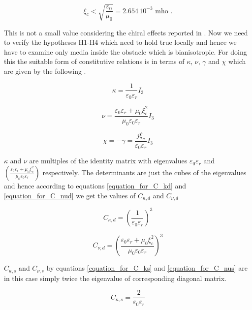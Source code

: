 \begin{equation} \label{eq:inf_sup_wu_jaggard}
\xi_c < \sqrt{\frac{\varepsilon_0}{\mu_0}} = 2.654 \, 10^{-3}  \text{ mho }.
\end{equation}

This is not a small value considering the chiral effects reported in \cite{wujaggard}. 
Now we need to verify the hypotheses H1-H4 which need to hold true locally and hence
we have to examine only media inside the obstacle which is bianisotropic. 
For doing this the suitable form 
of constitutive relations is in terms of $\kappa$, $\nu$, $\gamma$ and $\chi$ 
which are given by the following \cite{noiregolarita}. 

\begin{equation}
\kappa = \frac{1}{\varepsilon_0\varepsilon_r}I_3
\end{equation}

\begin{equation}
\nu = \frac{\varepsilon_0\varepsilon_r+\mu_0\xi_c^2}{\mu_0\varepsilon_0\varepsilon_r}I_3
\end{equation}

\begin{equation}
\chi = -\gamma = \frac{j\xi_c}{\varepsilon_0\varepsilon_r}I_3
\end{equation}

$\kappa$ and $\nu$ are multiples of the identity matrix with eigenvalues $\varepsilon_0\varepsilon_r$ 
and $(\frac{\varepsilon_0\varepsilon_r+\mu_0\xi_c^2}{\mu_0\varepsilon_0\varepsilon_r})$ respectively.
The determinants are just the cubes of the eigenvalues and hence according to equations 
\eqref{equation_for_C_kd} and \eqref{equation_for_C_nud} we get the values of $C_{\kappa,d}$ and 
$C_{\nu,d}$

\begin{equation}
C_{\kappa,d} = \left(\frac{1}{\varepsilon_0\varepsilon_r}\right)^3
\end{equation}

\begin{equation}
C_{\nu,d} = \left(\frac{\varepsilon_0\varepsilon_r+\mu_0\xi_c^2}{\mu_0\varepsilon_0\varepsilon_r}\right)^3
\end{equation}

$C_{\kappa,s}$ and $C_{\nu,s}$ by equations \eqref{equation_for_C_ks} and \eqref{equation_for_C_nus} 
are in this case simply twice the eigenvalue of corresponding diagonal matrix.

\begin{equation}
C_{\kappa,s} = \frac{2}{\varepsilon_0\varepsilon_r}
\end{equation}

